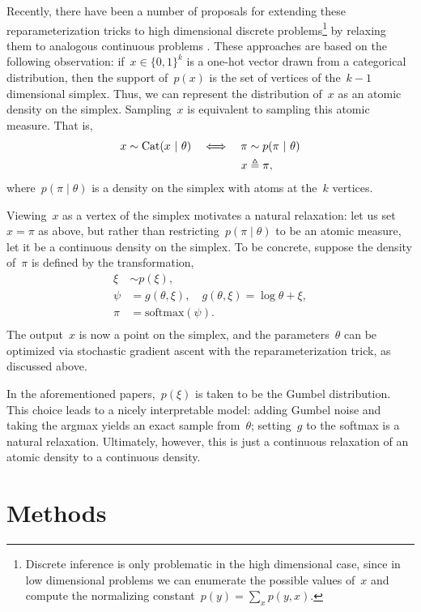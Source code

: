 \documentclass{article}
\begin{document}
Recently, there have been a number of proposals for extending these
reparameterization tricks to high dimensional discrete
problems\footnote{Discrete inference is only problematic in the high
dimensional case, since in low dimensional problems we can enumerate
the possible values of~$x$ and compute the normalizing constant~$p(y)
= \sum_x p(y, x)$.} by relaxing them to analogous continuous
problems \citep{maddison2016concrete, jang2016categorical,
kusner2016gans}.  These approaches are based on the following
observation: if~$x \in \{0,1\}^k$ is a one-hot vector drawn from a
categorical distribution, then the support of~$p(x)$ is the set of
vertices of the~$k-1$ dimensional simplex.  Thus, we can represent the
distribution of~$x$ as an atomic density on the simplex.  Sampling~$x$
is equivalent to sampling this atomic measure. That is,
\begin{align}
  x &\sim \mathrm{Cat}( x ~\vert~ \theta) &\iff& & {\pi} &\sim p({\pi} ~\vert~ \theta) \nonumber \\
  & & & & x &\triangleq {\pi},
\end{align}
where~$p({\pi} \mid \theta)$ is a density on the simplex with atoms at
the~$k$ vertices.

Viewing~$x$ as a vertex of the simplex motivates a natural relaxation:
let us set~$x={\pi}$ as above, but 
rather than restricting~$p({\pi} \mid \theta)$ to be an atomic measure,
let it be a continuous density on the simplex. To be concrete, suppose
the density of~${\pi}$ is defined by the transformation,
\begin{align}
  \xi &\sim p(\xi), \\
  \psi & = g(\theta, \xi),  \quad g(\theta, \xi) = \log \theta + \xi,
\\
  {\pi} &=  \text{softmax}(\psi). \\
  \end{align}
The output~$x$ is now a point on the simplex, and the parameters~$\theta$ can
be optimized via stochastic gradient ascent with the reparameterization trick,
as discussed above.

In the aforementioned papers,~$p(\xi)$ is taken to be the Gumbel distribution.
This choice leads to a nicely interpretable model: adding
Gumbel noise and taking the argmax yields an exact sample from~$\theta$;
setting~$g$ to the softmax is a natural relaxation. Ultimately, however, this
is just a continuous relaxation of an atomic density to a continuous
density. 
\section{Methods}
\end{document}
